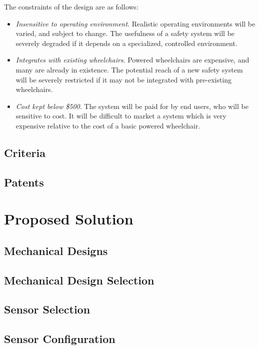 \documentclass[oneside,final]{report}
\begin{document}
The constraints of the design are as follows:

\begin{itemize}
 \item \emph{Insensitive to operating environment}.  Realistic operating environments will be varied, and subject to change.  The usefulness of a safety system will be severely degraded if it depends on a specialized, controlled environment.
 \item \emph{Integrates with existing wheelchairs}.  Powered wheelchairs are expensive, and many are already in existence.  The potential reach of a new safety system will be severely restricted if it may not be integrated with pre-existing wheelchairs.
 \item \emph{Cost kept below \$500}.  The system will be paid for by end users, who will be sensitive to cost.  It will be difficult to market a system which is very expensive relative to the cost of a basic powered wheelchair.
\end{itemize}

\section{Criteria}

\section{Patents}


\chapter{Proposed Solution}

\section{Mechanical Designs}

\section{Mechanical Design Selection}

\section{Sensor Selection}

\section{Sensor Configuration}
\end{document}
